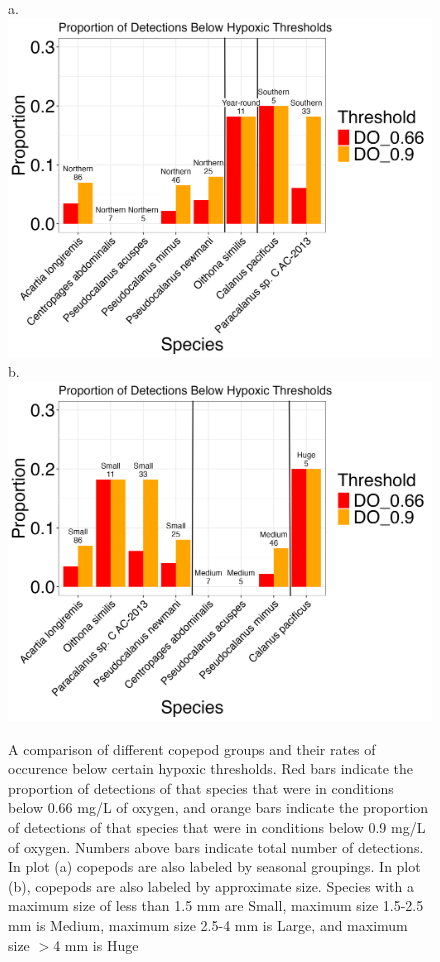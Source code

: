 \documentclass[12pt,twoside]{reedthesis}
\begin{document}
	\begin{figure}[!h]
		\begin{center}
			a. \includegraphics[scale=0.5]{Bar_Season} \\
			b. \includegraphics[scale=0.5]{Bar_Size}
			\caption[Proportion of Detections Below Thresholds 1]{\footnotesize{A comparison of different copepod groups and their rates of occurence below certain hypoxic thresholds. Red bars indicate the proportion of detections of that species that were in conditions below 0.66 mg/L of oxygen, and orange bars indicate the proportion of detections of that species that were in conditions below 0.9 mg/L of oxygen. Numbers above bars indicate total number of detections. In plot (a) copepods are also labeled by seasonal groupings. In plot (b), copepods are also labeled by approximate size. Species with a maximum size of less than 1.5 mm are Small, maximum size 1.5-2.5 mm is Medium, maximum size 2.5-4 mm is Large, and maximum size ${>}$4 mm is Huge \autocite{WoRMSWorldRegister}}} %
			\label{BarSeason}
		\end{center}
	\end{figure}    
	
\end{document}
